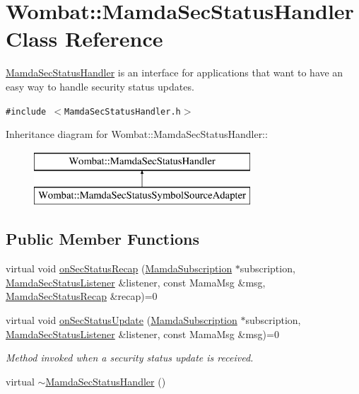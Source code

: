 \hypertarget{classWombat_1_1MamdaSecStatusHandler}{
\section{Wombat::Mamda\-Sec\-Status\-Handler Class Reference}
\label{classWombat_1_1MamdaSecStatusHandler}
}
\hyperlink{classWombat_1_1MamdaSecStatusHandler}{Mamda\-Sec\-Status\-Handler} is an interface for applications that want to have an easy way to handle security status updates.  


{\tt \#include $<$Mamda\-Sec\-Status\-Handler.h$>$}

Inheritance diagram for Wombat::Mamda\-Sec\-Status\-Handler::\begin{figure}[H]
\begin{center}
\leavevmode
\includegraphics[height=2cm]{classWombat_1_1MamdaSecStatusHandler}
\end{center}
\end{figure}
\subsection*{Public Member Functions}
\begin{CompactItemize}
\item 
virtual void \hyperlink{classWombat_1_1MamdaSecStatusHandler_7f49ada42883a664440776560fd6f083}{on\-Sec\-Status\-Recap} (\hyperlink{classWombat_1_1MamdaSubscription}{Mamda\-Subscription} $\ast$subscription, \hyperlink{classWombat_1_1MamdaSecStatusListener}{Mamda\-Sec\-Status\-Listener} \&listener, const Mama\-Msg \&msg, \hyperlink{classWombat_1_1MamdaSecStatusRecap}{Mamda\-Sec\-Status\-Recap} \&recap)=0
\item 
virtual void \hyperlink{classWombat_1_1MamdaSecStatusHandler_db36d5defe6bca39835cca9c9732bef2}{on\-Sec\-Status\-Update} (\hyperlink{classWombat_1_1MamdaSubscription}{Mamda\-Subscription} $\ast$subscription, \hyperlink{classWombat_1_1MamdaSecStatusListener}{Mamda\-Sec\-Status\-Listener} \&listener, const Mama\-Msg \&msg)=0
\begin{CompactList}\small\item\em Method invoked when a security status update is received. \item\end{CompactList}\item 
virtual \hyperlink{classWombat_1_1MamdaSecStatusHandler_58d2847fe2bdcb98b81dc311e25a581b}{$\sim$Mamda\-Sec\-Status\-Handler} ()
\end{CompactItemize}


